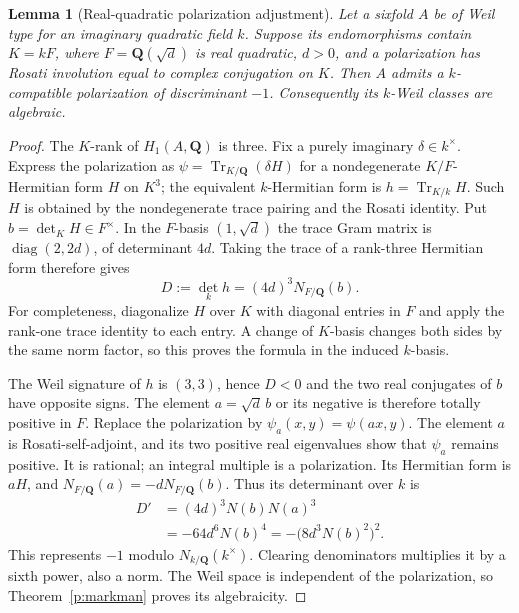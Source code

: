 \documentclass[11pt,reqno]{article}
\theoremstyle{emphasizedplain}
\theoremstyle{emphasizeddefinition}
\theoremstyle{emphasizeddefinition}
\newtheorem{prelemma}{Lemma}
\DeclareMathOperator{\Tr}{Tr}
\newcommand{\Q}{\mathbf Q}
\begin{document}
\begin{prelemma}[Real-quadratic polarization adjustment]\label{p:quartic-scale}
Let a sixfold $A$ be of Weil type for an imaginary quadratic field $k$.
Suppose its endomorphisms contain $K=kF$, where $F=\Q(\sqrt d)$ is
real quadratic, $d>0$, and a polarization has Rosati involution equal
to complex conjugation on $K$. Then $A$ admits a $k$-compatible
polarization of discriminant $-1$. Consequently its $k$-Weil classes
are algebraic.
\end{prelemma}
\begin{proof}
The $K$-rank of $H_1(A,\Q)$ is three. Fix a purely imaginary
$\delta\in k^\times$. Express the polarization as
$\psi=\Tr_{K/\Q}(\delta H)$ for a nondegenerate $K/F$-Hermitian
form $H$ on $K^3$; the equivalent $k$-Hermitian form is
$h=\Tr_{K/k}H$. Such $H$ is obtained by the nondegenerate trace pairing
and the Rosati identity. Put $b=\det_K H\in F^\times$.
In the $F$-basis $(1,\sqrt d)$ the trace Gram matrix is
$\operatorname{diag}(2,2d)$, of determinant $4d$. Taking the trace of
a rank-three Hermitian form therefore gives
\[
 D:=\det_k h=(4d)^3N_{F/\Q}(b).
\]
For completeness, diagonalize $H$ over $K$ with diagonal entries in
$F$ and apply the rank-one trace identity to each entry. A change of
$K$-basis changes both sides by the same norm factor, so this proves
the formula in the induced $k$-basis.

The Weil signature of $h$ is $(3,3)$, hence $D<0$ and the two real
conjugates of $b$ have opposite signs. The element
$a=\sqrt d\,b$ or its negative is therefore totally positive in $F$.
Replace the polarization by $\psi_a(x,y)=\psi(ax,y)$. The element $a$
is Rosati-self-adjoint, and its two positive real eigenvalues show that
$\psi_a$ remains positive. It is rational; an integral multiple is a
polarization. Its Hermitian form is $aH$, and
$N_{F/\Q}(a)=-dN_{F/\Q}(b)$. Thus its determinant over $k$ is
\[
 \begin{split}
 D'&=(4d)^3N(b)N(a)^3\\
   &=-64d^6N(b)^4
    =-\bigl(8d^3N(b)^2\bigr)^2.
 \end{split}
\]
This represents $-1$ modulo $N_{k/\Q}(k^\times)$.
Clearing denominators multiplies it by a sixth power, also a norm.
The Weil space is independent of the polarization, so
Theorem~\ref{p:markman} proves its algebraicity.
\end{proof}
\end{document}
